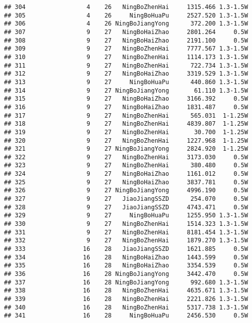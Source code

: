 \documentclass[]{article}
\begin{document}
\begin{verbatim}
## 304                 4    26   NingBoZhenHai     1315.466 1.3-1.5W
## 305                 4    26     NingBoHuaPu     2527.520 1.3-1.5W
## 306                 4    26 NingBoJiangYong      372.200 1.3-1.5W
## 307                 9    27   NingBoHaiZhao     2801.264     0.5W
## 308                 9    27   NingBoHaiZhao     2191.100     0.5W
## 309                 9    27   NingBoZhenHai     7777.567 1.3-1.5W
## 310                 9    27   NingBoZhenHai     1114.173 1.3-1.5W
## 311                 9    27   NingBoZhenHai      722.734 1.3-1.5W
## 312                 9    27   NingBoHaiZhao     3319.529 1.3-1.5W
## 313                 9    27     NingBoHuaPu      440.860 1.3-1.5W
## 314                 9    27 NingBoJiangYong       61.110 1.3-1.5W
## 315                 9    27   NingBoHaiZhao     3166.392     0.5W
## 316                 9    27   NingBoHaiZhao     1831.487     0.5W
## 317                 9    27   NingBoZhenHai      565.031  1-1.25W
## 318                 9    27   NingBoZhenHai     4839.807  1-1.25W
## 319                 9    27   NingBoZhenHai       30.700  1-1.25W
## 320                 9    27   NingBoZhenHai     1227.968  1-1.25W
## 321                 9    27 NingBoJiangYong     2824.920  1-1.25W
## 322                 9    27   NingBoZhenHai     3173.030     0.5W
## 323                 9    27   NingBoZhenHai      380.480     0.5W
## 324                 9    27   NingBoHaiZhao     1161.012     0.5W
## 325                 9    27   NingBoHaiZhao     3837.781     0.5W
## 326                 9    27 NingBoJiangYong     4996.190     0.5W
## 327                 9    27   JiaoJiangSSZD      254.070     0.5W
## 328                 9    27   JiaoJiangSSZD     4743.471     0.5W
## 329                 9    27     NingBoHuaPu     1255.950 1.3-1.5W
## 330                 9    27   NingBoZhenHai     1514.323 1.3-1.5W
## 331                 9    27   NingBoZhenHai     8181.454 1.3-1.5W
## 332                 9    27   NingBoZhenHai     1879.270 1.3-1.5W
## 333                16    28   JiaoJiangSSZD     1621.885     0.5W
## 334                16    28   NingBoHaiZhao     1443.599     0.5W
## 335                16    28   NingBoHaiZhao     3354.539     0.5W
## 336                16    28 NingBoJiangYong     3442.470     0.5W
## 337                16    28 NingBoJiangYong      992.680 1.3-1.5W
## 338                16    28   NingBoZhenHai     4635.671 1.3-1.5W
## 339                16    28   NingBoZhenHai     2221.826 1.3-1.5W
## 340                16    28   NingBoZhenHai     5317.738 1.3-1.5W
## 341                16    28     NingBoHuaPu     2456.530     0.5W

\end{verbatim}
\end{document}
